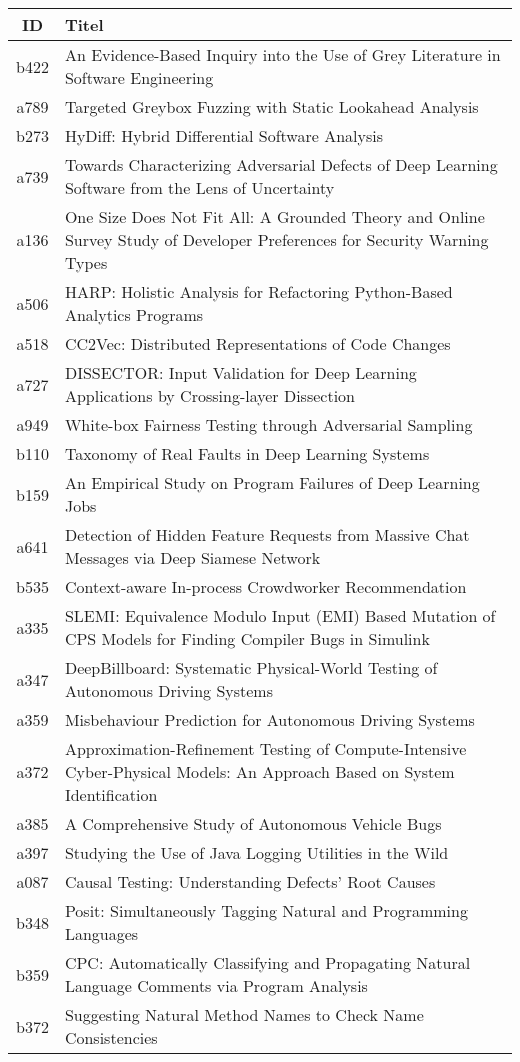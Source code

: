 \begin{table}[h!]
    \begin{tabular}{ c | p{14cm} }
        ID & Titel  \\
        \hline
        b422 & An Evidence-Based Inquiry into the Use of Grey Literature in Software Engineering  \\
        a789 & Targeted Greybox Fuzzing with Static Lookahead Analysis  \\
        b273 & HyDiff: Hybrid Differential Software Analysis  \\
        a739 & Towards Characterizing Adversarial Defects of Deep Learning Software from the Lens of Uncertainty  \\
        a136 & One Size Does Not Fit All: A Grounded Theory and Online Survey Study of Developer Preferences for Security Warning Types  \\
        a506 & HARP: Holistic Analysis for Refactoring Python-Based Analytics Programs  \\
        a518 & CC2Vec: Distributed Representations of Code Changes  \\
        a727 & DISSECTOR: Input Validation for Deep Learning Applications by Crossing-layer Dissection  \\
        a949 & White-box Fairness Testing through Adversarial Sampling  \\
        b110 & Taxonomy of Real Faults in Deep Learning Systems  \\
        b159 & An Empirical Study on Program Failures of Deep Learning Jobs  \\
        a641 & Detection of Hidden Feature Requests from Massive Chat Messages via Deep Siamese Network  \\
        b535 & Context-aware In-process Crowdworker Recommendation  \\
        a335 & SLEMI: Equivalence Modulo Input (EMI) Based Mutation of CPS Models for Finding Compiler Bugs in Simulink  \\
        a347 & DeepBillboard: Systematic Physical-World Testing of Autonomous Driving Systems  \\
        a359 & Misbehaviour Prediction for Autonomous Driving Systems  \\
        a372 & Approximation-Refinement Testing of Compute-Intensive Cyber-Physical Models: An Approach Based on System Identification  \\
        a385 & A Comprehensive Study of Autonomous Vehicle Bugs  \\
        a397 & Studying the Use of Java Logging Utilities in the Wild  \\
        a087 & Causal Testing: Understanding Defects' Root Causes  \\
        b348 & Posit: Simultaneously Tagging Natural and Programming Languages  \\
        b359 & CPC: Automatically Classifying and Propagating Natural Language Comments via Program Analysis  \\
        b372 & Suggesting Natural Method Names to Check Name Consistencies  \\
    \end{tabular}
\end{table}

